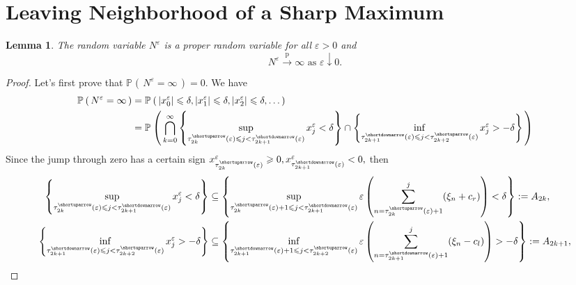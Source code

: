 \documentclass{article}
\theoremstyle{plain}
\newtheorem{lemma}[theorem]{Lemma}
\theoremstyle{definition}
\theoremstyle{remark}
\newcommand{\p}[2][]{{\mathbb{P}}_{#1} \left( \, #2 \, \right) } %
\newcommand{\pra}{ \overset{\mathrm{p}}{\longrightarrow}} %
\newcommand{\skk}[1]{\left\{ #1 \right\}} %
\newcommand{\eps}{ \varepsilon}
\begin{document}
\section{Leaving Neighborhood of a Sharp Maximum}\label{sec_ap_5}


\begin{lemma}\label{bound_prob_lemma}
The random variable $N^{\varepsilon}$ is a proper random variable for all $\varepsilon > 0$ and
$$
N^{\eps} \pra \infty \text{ as } \varepsilon \downarrow 0.
$$
\end{lemma}
\begin{proof}
Let's first prove that $\p{N^{\varepsilon} = \infty} = 0$. We have
\begin{equation*}
\begin{split}
    \p{N^{\varepsilon} = \infty} & = \p{\left|x_0^{\varepsilon}\right| \leqslant \delta, \left|x_1^{\varepsilon}\right| \leqslant \delta, \left|x_2^{\varepsilon}\right| \leqslant \delta, \ldots} \\
    &  = \p{\bigcap_{k=0}^{\infty} \skk{ \sup\limits_{{\tau_{2 k}^{\shortuparrow}(\varepsilon)}\leqslant j <   \tau_{2 k+1}^{\shortdownarrow}(\varepsilon)} x_j^{\varepsilon} < \delta }  \cap \skk{\inf\limits_{{\tau_{2 k+1}^{\shortdownarrow}(\varepsilon)}\leqslant j <   \tau_{2 k+2}^{\shortuparrow}(\varepsilon)} x_j^{\varepsilon} > -\delta} }
\end{split}
\end{equation*}
Since the jump through zero has a certain sign $x_{\tau_{2 k}^{\shortuparrow}(\varepsilon)}^{\varepsilon} \geqslant 0,  x_{\tau_{2 k+1}^{\shortdownarrow}(\varepsilon)}^{\varepsilon} < 0, $  then 
\begin{equation*}
\begin{split}
\skk{ \sup\limits_{{\tau_{2 k}^{\shortuparrow}(\varepsilon)}\leqslant j <   \tau_{2 k+1}^{\shortdownarrow}(\varepsilon)} x_j^{\varepsilon}  < \delta } & \subseteq  \skk{ \sup\limits_{{\tau_{2 k}^{\shortuparrow}(\varepsilon) + 1}\leqslant j <   \tau_{2 k+1}^{\shortdownarrow}(\varepsilon)} \varepsilon\left( \sum_{n= \tau_{2 k}^{\shortuparrow}(\varepsilon) + 1}^j (\xi_n + c_r)\right) < \delta} := A_{2k},  \\ 
\skk{ \inf\limits_{{\tau_{2 k+1}^{\shortdownarrow}(\varepsilon)} \leqslant j <   \tau_{2 k+2}^{\shortuparrow}(\varepsilon)} x_j^{\varepsilon}  > -\delta }& \subseteq \skk{ \inf\limits_{{\tau_{2 k+1}^{\shortdownarrow}(\varepsilon)} + 1\leqslant j <   \tau_{2 k+2}^{\shortuparrow}(\varepsilon)}  \varepsilon\left( \sum_{n= \tau_{2 k+1}^{\shortdownarrow}(\varepsilon) + 1}^j (\xi_n - c_l)\right) > -\delta} := A_{2k+1}, 

\end{split}
\end{equation*}
\end{proof}
\end{document}
